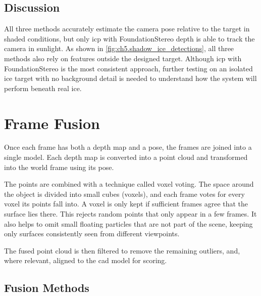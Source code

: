 \subsection{Discussion}
\label{subsec:ch5.pose_discussion}
All three methods accurately estimate the camera pose relative to the target
in shaded conditions, but only \gls{icp} with FoundationStereo depth is able to
track the camera in sunlight. As shown in \autoref{fig:ch5.shadow_ice_detections}, all three methods also rely on
features outside the designed target. Although \gls{icp} with FoundationStereo is
the most consistent approach, further testing on an isolated ice target with
no background detail is needed to understand how the system will perform
beneath real ice.




\section{Frame Fusion}
\label{sec:ch5.frame_integration}
Once each frame has both a depth map and a pose, the frames are joined into a single model.
Each depth map is converted into a point cloud and transformed into the world frame using its pose.

The points are combined with a technique called voxel voting. The space around the object is divided into small
cubes (voxels), and each frame votes for every voxel its points fall into. A voxel is only kept if sufficient frames
agree that the surface lies there. This rejects random points that only appear in a few frames. It also helps
to omit small floating particles that are not part of the scene, keeping only surfaces consistently seen from 
different viewpoints. 

The fused point cloud is then filtered to remove the remaining outliers, and, where relevant, aligned to the \gls{cad} model 
for scoring. 

\subsection{Fusion Methods}
\label{subsec:ch5.fusion_methods}



